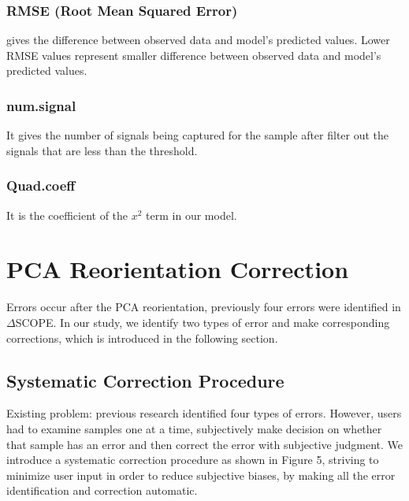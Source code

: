 \documentclass[10pt,letterpaper]{article}
\begin{document}
\hypertarget{rmse-root-mean-squared-error}{%
\subsubsection{RMSE (Root Mean Squared
Error)}\label{rmse-root-mean-squared-error}}

gives the difference between observed data and model's predicted values.
Lower RMSE values represent smaller difference between observed data and
model's predicted values.

\hypertarget{num.signal}{%
\subsubsection{num.signal}\label{num.signal}}

It gives the number of signals being captured for the sample after
filter out the signals that are less than the threshold.

\hypertarget{quad.coeff}{%
\subsubsection{Quad.coeff}\label{quad.coeff}}

It is the coefficient of the \(x^2\) term in our model.

\hypertarget{pca-reorientation-correction}{%
\section{PCA Reorientation
Correction}\label{pca-reorientation-correction}}

Errors occur after the PCA reorientation, previously four errors were
identified in \(\Delta\)SCOPE. In our study, we identify two types of
error and make corresponding corrections, which is introduced in the
following section.

\hypertarget{systematic-correction-procedure}{%
\subsection{Systematic Correction
Procedure}\label{systematic-correction-procedure}}

Existing problem: previous research identified four types of errors.
However, users had to examine samples one at a time, subjectively make
decision on whether that sample has an error and then correct the error
with subjective judgment. We introduce a systematic correction procedure
as shown in Figure 5, striving to minimize user input in order to reduce
subjective biases, by making all the error identification and correction
automatic.
\end{document}
